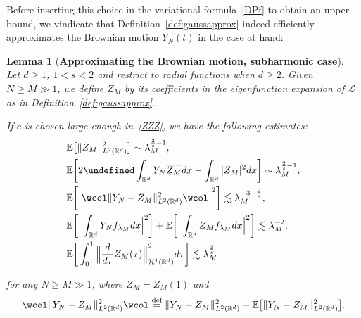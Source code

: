 \documentclass[%
11pt,  reqno]{amsart}
\newtheorem{lemma}[theorem]{Lemma}
\theoremstyle{remarkstyle}
\newcommand{\1}{\hspace{0.2mm}\text{I}\hspace{0.2mm}}
\newcommand{\noi}{\noindent}
\newcommand{\R}{\mathbb{R}}
\let\Re=\undefined\DeclareMathOperator*{\Re}{Re}
\newcommand{\E}{\mathbb{E}}
\renewcommand{\L}{\mathcal{L}}
\newcommand{\ld}{\lambda}
\newcommand{\cj}{\overline}
\newcommand{\wick}[1]{\wcol#1\wcol}
\newcommand{\les}{\lesssim}
\renewcommand{\H}{\mathcal{H}}
\numberwithin{equation}{section}
\numberwithin{theorem}{section}
\begin{document}
	
	Before inserting this choice in the variational formula~\eqref{DPf} to obtain an upper bound, we vindicate that Definition~\ref{def:gaussapprox} indeed efficiently approximates the Brownian motion $Y_N (t)$ in the case at hand:
	
	\begin{lemma}[\textbf{Approximating the Brownian motion, subharmonic case}] 
		\label{LEM:approx}\mbox{}\\
		Let $d\ge 1$, $1<s<2$ and restrict to radial functions when $d\ge 2$. Given $ N \ge M\gg 1$,  we define $Z_M$ by its coefficients in the eigenfunction expansion of $\L$
		as in Definition~\ref{def:gaussapprox}.
		
		If $c$ is chosen large enough in~\eqref{ZZZ}, we have the following estimates:
		\begin{align}
			&\E \big[ \|Z_M \|_{L^2({\R^d})}^2 \big]  \sim  \ld_M^{\frac2s-1},
			\label{NRZ0}\\
			&\E\bigg[  2 \Re \int_{{\R^d}} Y_N \cj{Z_M} dx - \int_{{\R^d}} |Z_M|^2 dx   \bigg] \sim \ld_M^{\frac2s-1}, \label{NRZ1}\\
			&\E \bigg[  \Big|  \wick{\| Y_N-Z_M\|_{L^2({\R^d})}^2}  \Big|^2      \bigg] \les \ld_M^{- 3+ \frac{2}s},    \label{NRZ3}\\
			&\E\bigg[\Big| \int_{{\R^d}} Y_N  f_{\ld_M} dx \Big|^2\bigg] 
			+ \E\bigg[\Big| \int_{{\R^d}} Z_M  f_{\ld_M} dx \Big|^2\bigg] \les \ld_M^{- 2},   \label{NRZ5}\\
			&\E\bigg[\int_0^1 \Big\| \frac d {d\tau} Z_M(\tau) \Big\|^2_{\H^1 (\R^d)}d\tau\bigg] \les   \ld_M^{\frac{2}s} \label{NRZ6}
		\end{align}
		
		\noi
		for any $N \ge M \gg 1$, 
		where  $Z_M =Z_M (1)$
		and
		\begin{align}
			\wick{ \| Y_N-Z_M\|_{L^2({\R^d})}^2} \stackrel{\textup{def}}{=} 
			\| Y_N-Z_M\|_{L^2({\R^d})}^2 - \E\big[ \| Y_N-Z_M\|_{L^2({\R^d})}^2 \big].
			\label{ZZZ2}
		\end{align}
	\end{lemma}
	
\end{document}
